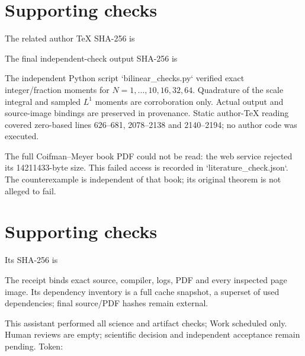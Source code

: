 \documentclass[10pt]{article}
\begin{document}
\section*{Supporting checks}
The related author TeX SHA-256 is\par
The final independent-check output SHA-256 is\par
The independent Python script `bilinear\_checks.py` verified exact integer/fraction moments for \(N=1,\ldots,10,16,32,64\). Quadrature of the scale integral and sampled \(L^1\) moments are corroboration only. Actual output and source-image bindings are preserved in provenance. Static author-TeX reading covered zero-based lines 626–681, 2078–2138 and 2140–2194; no author code was executed.\par
The full Coifman–Meyer book PDF could not be read: the web service rejected its 14211433-byte size. This failed access is recorded in `literature\_check.json`. The counterexample is independent of that book; its original theorem is not alleged to fail.\par
\section*{Supporting checks}
Its SHA-256 is\par
The receipt binds exact source, compiler, logs, PDF and every inspected page image. Its dependency inventory is a full cache snapshot, a superset of used dependencies; final source/PDF hashes remain external.\par
This assistant performed all science and artifact checks; Work scheduled only. Human reviews are empty; scientific decision and independent acceptance remain pending. Token:\par
\end{document}
